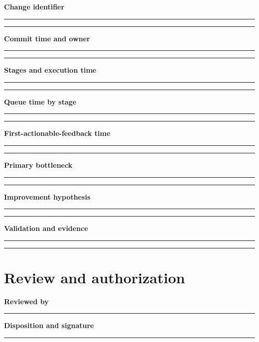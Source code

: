 \documentclass[10pt,letterpaper]{article}
\begin{document}
\textbf{Change identifier}\par
\noindent\rule{\linewidth}{0.35pt}\par\vspace{0.7em}
\noindent\rule{\linewidth}{0.35pt}\par\vspace{0.7em}
\textbf{Commit time and owner}\par
\noindent\rule{\linewidth}{0.35pt}\par\vspace{0.7em}
\noindent\rule{\linewidth}{0.35pt}\par\vspace{0.7em}
\textbf{Stages and execution time}\par
\noindent\rule{\linewidth}{0.35pt}\par\vspace{0.7em}
\noindent\rule{\linewidth}{0.35pt}\par\vspace{0.7em}
\textbf{Queue time by stage}\par
\noindent\rule{\linewidth}{0.35pt}\par\vspace{0.7em}
\noindent\rule{\linewidth}{0.35pt}\par\vspace{0.7em}
\textbf{First-actionable-feedback time}\par
\noindent\rule{\linewidth}{0.35pt}\par\vspace{0.7em}
\noindent\rule{\linewidth}{0.35pt}\par\vspace{0.7em}
\textbf{Primary bottleneck}\par
\noindent\rule{\linewidth}{0.35pt}\par\vspace{0.7em}
\noindent\rule{\linewidth}{0.35pt}\par\vspace{0.7em}
\textbf{Improvement hypothesis}\par
\noindent\rule{\linewidth}{0.35pt}\par\vspace{0.7em}
\noindent\rule{\linewidth}{0.35pt}\par\vspace{0.7em}
\textbf{Validation and evidence}\par
\noindent\rule{\linewidth}{0.35pt}\par\vspace{0.7em}
\noindent\rule{\linewidth}{0.35pt}\par\vspace{0.7em}
\section{Review and authorization}
\textbf{Reviewed by}\par
\noindent\rule{\linewidth}{0.35pt}\par\vspace{0.7em}
\textbf{Disposition and signature}\par
\noindent\rule{\linewidth}{0.35pt}\par\vspace{0.7em}
\end{document}
